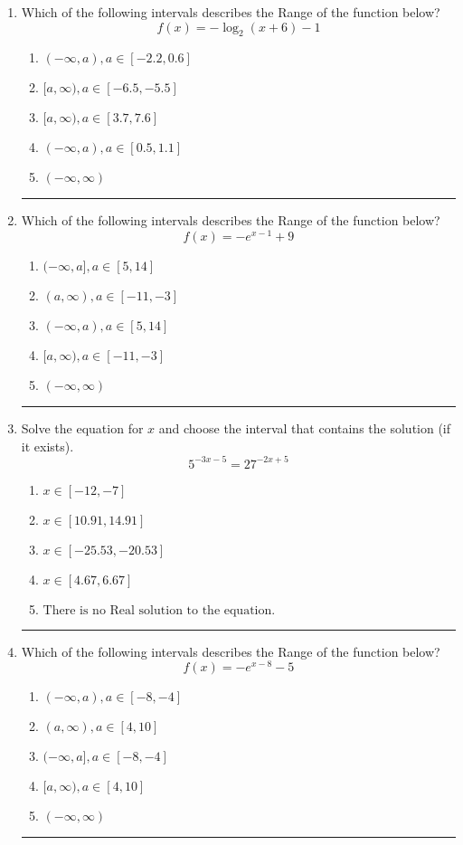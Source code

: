\documentclass[14pt]{extbook}
\newcommand{\litem}[1]{\item#1\hspace*{-1cm}\rule{\textwidth}{0.4pt}}
\begin{document}
\begin{enumerate}
\litem{
Which of the following intervals describes the Range of the function below?\[ f(x) = -\log_2{(x+6)}-1 \]\begin{enumerate}[label=\Alph*.]
\item \( (-\infty, a), a \in [-2.2, 0.6] \)
\item \( [a, \infty), a \in [-6.5, -5.5] \)
\item \( [a, \infty), a \in [3.7, 7.6] \)
\item \( (-\infty, a), a \in [0.5, 1.1] \)
\item \( (-\infty, \infty) \)

\end{enumerate} }
\litem{
Which of the following intervals describes the Range of the function below?\[ f(x) = -e^{x-1}+9 \]\begin{enumerate}[label=\Alph*.]
\item \( (-\infty, a], a \in [5, 14] \)
\item \( (a, \infty), a \in [-11, -3] \)
\item \( (-\infty, a), a \in [5, 14] \)
\item \( [a, \infty), a \in [-11, -3] \)
\item \( (-\infty, \infty) \)

\end{enumerate} }
\litem{
Solve the equation for $x$ and choose the interval that contains the solution (if it exists).\[ 5^{-3x-5} = 27^{-2x+5} \]\begin{enumerate}[label=\Alph*.]
\item \( x \in [-12, -7] \)
\item \( x \in [10.91, 14.91] \)
\item \( x \in [-25.53, -20.53] \)
\item \( x \in [4.67, 6.67] \)
\item \( \text{There is no Real solution to the equation.} \)

\end{enumerate} }
\litem{
Which of the following intervals describes the Range of the function below?\[ f(x) = -e^{x-8}-5 \]\begin{enumerate}[label=\Alph*.]
\item \( (-\infty, a), a \in [-8, -4] \)
\item \( (a, \infty), a \in [4, 10] \)
\item \( (-\infty, a], a \in [-8, -4] \)
\item \( [a, \infty), a \in [4, 10] \)
\item \( (-\infty, \infty) \)


\end{enumerate}}
\end{enumerate}
\end{document}
